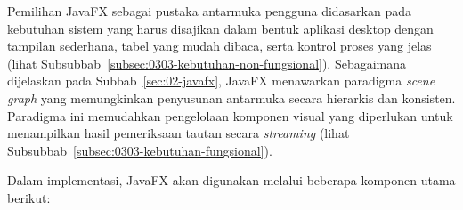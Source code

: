 
Pemilihan JavaFX sebagai pustaka antarmuka pengguna didasarkan pada kebutuhan sistem yang harus disajikan dalam bentuk aplikasi desktop dengan tampilan sederhana, tabel yang mudah dibaca, serta kontrol proses yang jelas (lihat Subsubbab~\ref{subsec:0303-kebutuhan-non-fungsional}). Sebagaimana dijelaskan pada Subbab~\ref{sec:02-javafx}, JavaFX menawarkan paradigma \textit{scene graph} yang memungkinkan penyusunan antarmuka secara hierarkis dan konsisten. Paradigma ini memudahkan pengelolaan komponen visual yang diperlukan untuk menampilkan hasil pemeriksaan tautan secara \textit{streaming} (lihat Subsubbab~\ref{subsec:0303-kebutuhan-fungsional}).

Dalam implementasi, JavaFX akan digunakan melalui beberapa komponen utama berikut:

